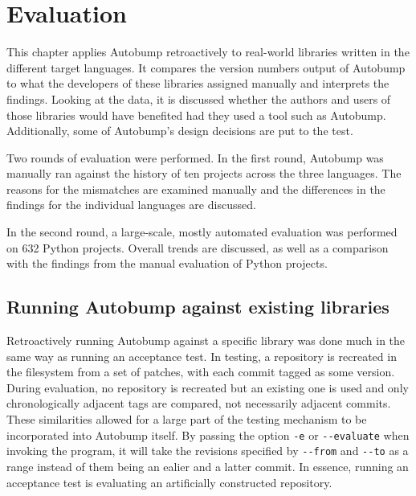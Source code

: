\documentclass{l4proj}
\newcommand\genericstyle{\lstset{basicstyle=\ttm}}
\newcommand\codeinline[1]{{\genericstyle\lstinline!#1!}}
\begin{document}
\chapter{Evaluation}
\label{Evaluation}

This chapter applies Autobump retroactively to real-world libraries
written in the different target languages. It compares the version
numbers output of Autobump to what the developers of these libraries
assigned manually and interprets the findings. Looking at the data, it
is discussed whether the authors and users of those libraries would
have benefited had they used a tool such as Autobump. Additionally,
some of Autobump's design decisions are put to the test.

Two rounds of evaluation were performed. In the first round, Autobump
was manually ran against the history of ten projects across the
three languages. The reasons for the mismatches are examined manually
and the differences in the findings for the individual languages are
discussed.

In the second round, a large-scale, mostly automated evaluation was
performed on 632 Python projects. Overall trends are discussed, as
well as a comparison with the findings from the manual evaluation of
Python projects.

\section{Running Autobump against existing libraries}

Retroactively running Autobump against a specific library was done
much in the same way as running an acceptance test. In testing, a
repository is recreated in the filesystem from a set of patches, with
each commit tagged as some version. During evaluation, no repository
is recreated but an existing one is used and only chronologically
adjacent tags are compared, not necessarily adjacent commits. These
similarities allowed for a large part of the testing mechanism to be
incorporated into Autobump itself. By passing the option
\codeinline{-e} or \codeinline{--evaluate} when invoking the program,
it will take the revisions specified by \codeinline{--from} and
\codeinline{--to} as a range instead of them being an ealier and a
latter commit. In essence, running an acceptance test is evaluating an
artificially constructed repository.
\end{document}
